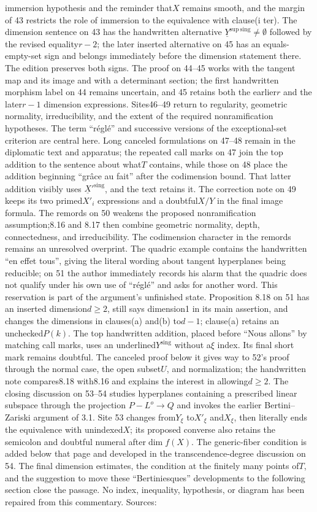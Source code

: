 \documentclass[10pt,a4paper]{article}
\begin{document}
immersion hypothesis and the reminder that$X$ remains smooth, and the margin of 43 restricts the role of immersion to the equivalence with clause(i ter). The dimension sentence on 43 has the handwritten alternative $\underline{Y}^{\mathrm{sup\ sing}}\neq\emptyset$ followed by the revised equality$r-2$; the later inserted alternative on 45 has an equals-empty-set sign and belongs immediately before the dimension statement there. The edition preserves both signs. The proof on 44--45 works with the tangent map and its image and with a determinant section; the first handwritten morphism label on 44 remains uncertain, and 45 retains both the earlier$r$ and the later$r-1$ dimension expressions. Sites46--49 return to regularity, geometric normality, irreducibility, and the extent of the required nonramification hypotheses. The term ``réglé'' and successive versions of the exceptional-set criterion are central here. Long canceled formulations on 47--48 remain in the diplomatic text and apparatus; the repeated call marks on 47 join the top addition to the sentence about what$T$ contains, while those on 48 place the addition beginning ``grâce au fait'' after the codimension bound. That latter addition visibly uses $\underline{X}'^{\mathrm{sing}}$, and the text retains it. The correction note on 49 keeps its two primed$X'_i$ expressions and a doubtful$X/Y$ in the final image formula. The remords on 50 weakens the proposed nonramification assumption;8.16 and 8.17 then combine geometric normality, depth, connectedness, and irreducibility. The codimension character in the remords remains an unresolved overprint. The quadric example contains the handwritten ``en effet tous'', giving the literal wording about tangent hyperplanes being reducible; on 51 the author immediately records his alarm that the quadric does not qualify under his own use of ``réglé'' and asks for another word. This reservation is part of the argument's unfinished state. Proposition 8.18 on 51 has an inserted dimension$d\geq2$, still says dimension1 in its main assertion, and changes the dimensions in clauses(a) and(b) to$d-1$; clause(a) retains an unchecked$P(k)$. The top handwritten addition, placed before ``Nous allons'' by matching call marks, uses an underlined$Y^{\mathrm{sing}}$ without a$\xi$ index. Its final short mark remains doubtful. The canceled proof below it gives way to 52's proof through the normal case, the open subset$U$, and normalization; the handwritten note compares8.18 with8.16 and explains the interest in allowing$d\geq2$. The closing discussion on 53--54 studies hyperplanes containing a prescribed linear subspace through the projection $P-L^o\to Q$ and invokes the earlier Bertini--Zariski argument of 3.1. Site 53 changes from$Y_\xi$ to$X'_\xi$ and$X_\xi$, then literally ends the equivalence with unindexed$X$; its proposed converse also retains the semicolon and doubtful numeral after$\dim f(X)$. The generic-fiber condition is added below that page and developed in the transcendence-degree discussion on 54. The final dimension estimates, the condition at the finitely many points of$T$, and the suggestion to move these ``Bertiniesques'' developments to the following section close the passage. No index, inequality, hypothesis, or diagram has been repaired from this commentary. Sources: 
\end{document}
